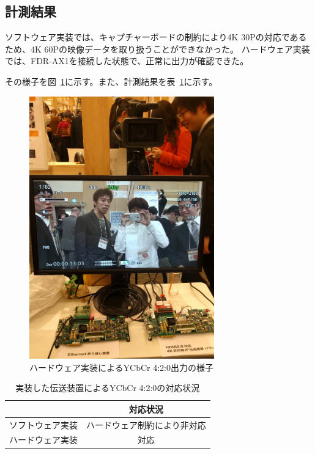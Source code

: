 \subsection{計測結果}
ソフトウェア実装では、キャプチャーボードの制約により4K 30Pの対応であるため、4K 60Pの映像データを取り扱うことができなかった。
ハードウェア実装では、FDR-AX1を接続した状態で、正常に出力が確認できた。

その様子を図~\ref{fig:orf2016}に示す。また、計測結果を表~\ref{tb:ycbcr-compatible}に示す。

\begin{figure}[htbp]
  \begin{center}
    \includegraphics[bb=0 0 1200 1703,width=8cm]{img/orf2016.png}
  \end{center}
  \caption{ハードウェア実装によるYCbCr 4:2:0出力の様子}
  \label{fig:orf2016}
\end{figure}

\begin{table}[htbp]
  \caption{実装した伝送装置によるYCbCr 4:2:0の対応状況}
  \label{tb:ycbcr-compatible}
  \begin{center}
  \begin{tabular}{c|c}
    \hline
                   & 対応状況 \\\hline\hline
     ソフトウェア実装 & ハードウェア制約により非対応  \\\hline
     ハードウェア実装 & 対応  \\\hline
  \end{tabular}\end{center}
\end{table}

